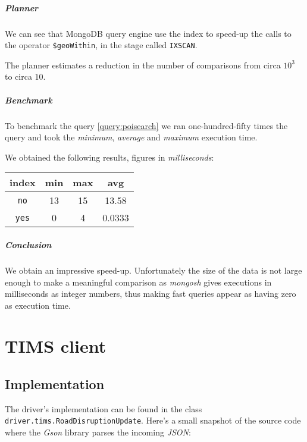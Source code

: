\paragraph{Planner}
We can see that MongoDB query engine use the index to speed-up the calls to the
operator \texttt{\$geoWithin}, in the stage called \texttt{IXSCAN}.

The planner estimates a reduction in the number of comparisons from circa
$10^3$ to circa $10$.



\paragraph{Benchmark}
To benchmark the query \ref{query:poisearch} we ran one-hundred-fifty times the
query
and took the \textit{minimum}, \textit{average} and \textit{maximum} execution
time.



We obtained the following results, figures in \textit{milliseconds}:

\begin{tabular}{|c|c|c|c|}
	\hline
	index & min & max & avg \\
	\hline
	\hline
	\texttt{no} & 13 & 15 & 13.58 \\
	\hline
	\texttt{yes} & 0 & 4 & 0.0333 \\
	\hline
\end{tabular}

\paragraph{Conclusion}
We obtain an impressive speed-up. Unfortunately the size of the data is not
large enough to make a meaningful comparison as \textit{mongosh} gives
executions in milliseconds as integer numbers, thus making fast queries appear
as having zero as execution time.

\chapter{TIMS client}

\section{Implementation}
The driver's implementation can be found in the class 
\texttt{driver.tims.RoadDisruptionUpdate}. Here's a small snapshot of the 
source code where the \textit{Gson} library parses the incoming \textit{JSON}:

